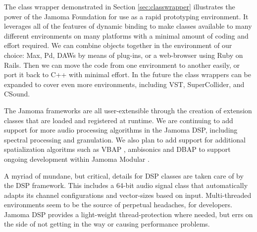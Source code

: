 \documentclass[twoside,10pt]{article}
\begin{document}



The class wrapper demonstrated in Section \ref{sec:classwrapper} illustrates the power of the Jamoma Foundation for use as a rapid prototyping environment.  It leverages all of the features of dynamic binding to make classes available to many different environments on many platforms with a minimal amount of coding and effort required.  We can combine objects together in the environment of our choice: Max, Pd, DAWs by means of plug-ins, or a web-browser using Ruby on Rails.  Then we can move the code from one environment to another easily, or port it back to C++ with minimal effort. In the future the class wrappers can be expanded to cover even more environments, including VST, SuperCollider, and CSound.

The Jamoma frameworks are all user-extensible through the creation of extension classes that are loaded and registered at runtime.  We are continuing to add support for more audio processing algorithms in the Jamoma DSP, including spectral processing and granulation. We also plan to add support for additional spatialization algoritms such as VBAP \cite{Pulkki:1997vbap}, ambisonics \cite{Gerzon:1974surround, Poletti:2000holographic_sound} and DBAP \cite{Lossius:2009} to support ongoing development within Jamoma Modular \cite{Peters:2009}.




A myriad of mundane, but critical, details for DSP classes are taken care of by the DSP framework.  This includes a 64-bit audio signal class that automatically adapts its channel configurations and vector-sizes based on input.  Multi-threaded environments seem to be the source of perpetual headaches, for developers.  Jamoma DSP provides a light-weight thread-protection where needed, but errs on the side of not getting in the way or causing performance problems.  
\end{document}
